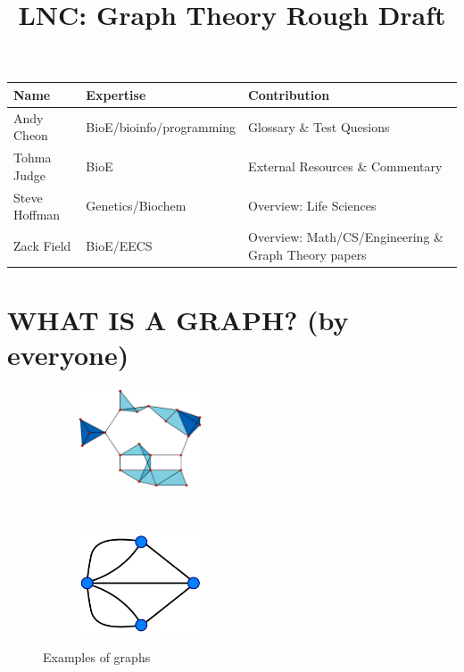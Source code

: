 \documentclass[11pt]{article}
\title{LNC: Graph Theory Rough Draft}
\author{\Name}%
\begin{document}
\maketitle


\begin{tabular}{| l | l | p{6cm} |}
\hline
{\bf Name} & {\bf Expertise} & {\bf Contribution} \\ \hline 
Andy Cheon & BioE/bioinfo/programming & Glossary \& Test Quesions \\ \hline
Tohma Judge & BioE & External Resources \& Commentary \\ \hline
Steve Hoffman & Genetics/Biochem & Overview: Life Sciences \\ \hline
Zack Field & BioE/EECS & Overview: Math/CS/Engineering \& Graph Theory papers \\ \hline
\end{tabular}


\section*{WHAT IS A GRAPH? (by everyone)}  

\begin{figure}
        \centering
        \begin{subfigure}{\textwidth}
                \includegraphics[width=0.4\textwidth]{clique.png}
                \label{fig:clique}
        \end{subfigure}%
         ~ %
        \begin{subfigure}{\textwidth}
                \includegraphics[width=0.4\textwidth]{konig7.png}
                \label{fig:konig}
        \end{subfigure}
        \caption{Examples of graphs}\label{fig:graphs}
\end{figure}
\end{document}
